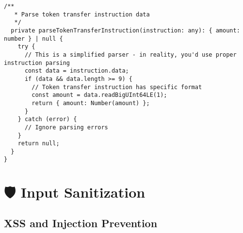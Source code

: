 \documentclass[11pt,a4paper]{article}
\begin{document}
\begin{lstlisting}[style=typescript, caption=Comprehensive Transaction Security]
  /**
   * Parse token transfer instruction data
   */
  private parseTokenTransferInstruction(instruction: any): { amount: number } | null {
    try {
      // This is a simplified parser - in reality, you'd use proper instruction parsing
      const data = instruction.data;
      if (data && data.length >= 9) {
        // Token transfer instruction has specific format
        const amount = data.readBigUInt64LE(1);
        return { amount: Number(amount) };
      }
    } catch (error) {
      // Ignore parsing errors
    }
    return null;
  }
}
\end{lstlisting}

\section{🛡️ Input Sanitization}

\subsection{XSS and Injection Prevention}
\end{document}
